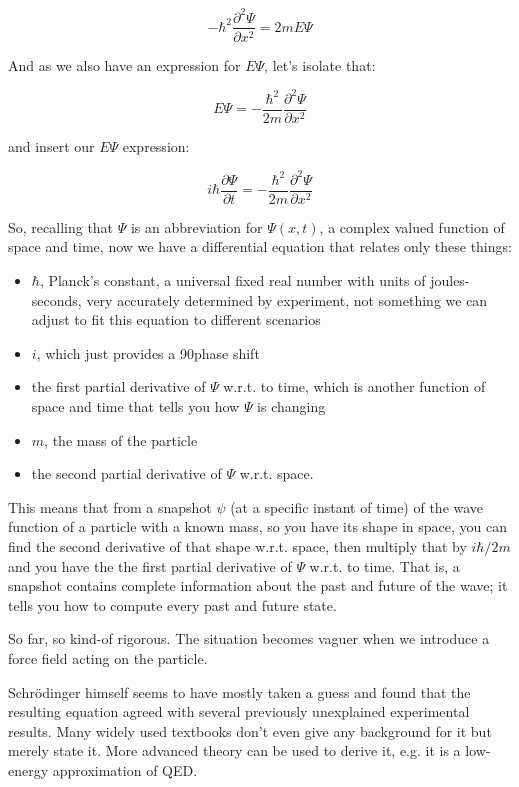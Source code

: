$$
- \hbar^2 \frac{\partial^2 \Psi}{\partial x^2}
= 2mE\Psi
$$

And as we also have an expression for $E\Psi$, let's isolate that:

$$
E\Psi =
- \frac{\hbar^2}{2m} \frac{\partial^2 \Psi}{\partial x^2}
$$

and insert our $E\Psi$ expression:

$$
i\hbar \frac{\partial \Psi}{\partial t}
=
- \frac{\hbar^2}{2m} \frac{\partial^2 \Psi}{\partial x^2}
$$

So, recalling that $\Psi$ is an abbreviation for $\Psi(x, t)$, a complex valued function of space and time, now we have a differential equation that relates only these things:

\begin{itemize}
  \item $\hbar$, Planck's constant, a universal fixed real number with units of joules-seconds, very accurately determined by experiment, not something we can adjust to fit this equation to different scenarios
  \item $i$, which just provides a 90\textdegree phase shift
  \item the first partial derivative of $\Psi$ w.r.t. to time, which is another function of space and time that tells you how $\Psi$ is changing
  \item $m$, the mass of the particle
  \item the second partial derivative of $\Psi$ w.r.t. space.
\end{itemize}

This means that from a snapshot $\psi$ (at a specific instant of time) of the wave function of a particle with a known mass, so you have its shape in space, you can find the second derivative of that shape w.r.t. space, then multiply that by $i\hbar/2m$ and you have the the first partial derivative of $\Psi$ w.r.t. to time. That is, a snapshot contains complete information about the past and future of the wave; it tells you how to compute every past and future state.

So far, so kind-of rigorous. The situation becomes vaguer when we introduce a force field acting on the particle.

Schrödinger himself seems to have mostly taken a guess and found that the resulting equation agreed with several previously unexplained experimental results. Many widely used textbooks don't even give any background for it but merely state it. More advanced theory can be used to derive it, e.g. it is a low-energy approximation of QED.

